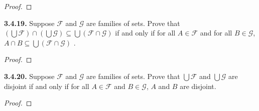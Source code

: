 \documentclass[12pt]{amsart}
\newenvironment{statement}[1]{\smallskip\noindent\color[rgb]{.6627, .3529, .6314} {\bf #1.}}{}
\theoremstyle{definition}
\theoremstyle{remark}
\begin{document}
\begin{proof}
\end{proof}


\begin{statement}{3.4.19}
Suppose $\mathcal{F}$ and $\mathcal{G}$ are families of sets.
Prove that $\left( \bigcup \mathcal{F} \right) \cap \left( \bigcup \mathcal{G} \right) \subseteq \bigcup (\mathcal{F} \cap \mathcal{G})$ if and only if for all $A \in \mathcal{F}$ and for all $B \in \mathcal{G}$, $A \cap B \subseteq \bigcup (\mathcal{F} \cap \mathcal{G})$ .
\end{statement}

\begin{proof}
\end{proof}


\begin{statement}{3.4.20}
Suppose $\mathcal{F}$ and $\mathcal{G}$ are families of sets.
Prove that $\bigcup \mathcal{F}$ and $\bigcup \mathcal{G}$ are disjoint if and only if for all $A \in \mathcal{F}$ and $B \in \mathcal{G}$, $A$ and $B$ are disjoint.
\end{statement}

\begin{proof}
\end{proof}
\end{document}
